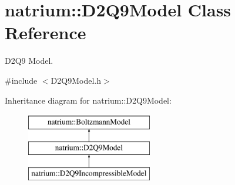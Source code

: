 \hypertarget{classnatrium_1_1D2Q9Model}{\section{natrium\-:\-:D2\-Q9\-Model Class Reference}
\label{classnatrium_1_1D2Q9Model}
}


D2\-Q9 Model.  




{\ttfamily \#include $<$D2\-Q9\-Model.\-h$>$}

Inheritance diagram for natrium\-:\-:D2\-Q9\-Model\-:\begin{figure}[H]
\begin{center}
\leavevmode
\includegraphics[height=3.000000cm]{classnatrium_1_1D2Q9Model}
\end{center}
\end{figure}
